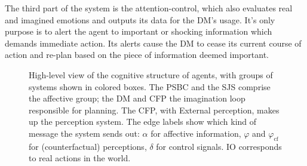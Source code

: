 The third part of the system is the attention-control, which also evaluates real and imagined emotions and outputs its data for the DM's usage. It's only purpose is to alert the agent to important or shocking information which demands immediate action. Its alerts cause the DM to cease its current course of action and re-plan based on the piece of information deemed important.

\begin{figure}
	\centering
	
	\caption{High-level view of the cognitive structure of agents, with groups of systems shown in colored boxes. The PSBC and the SJS comprise the affective group; the DM and CFP the imagination loop responsible for planning. The CFP, with External perception, makes up the perception system. The edge labels show which kind of message the system sends out: $\alpha$ for affective information, $\varphi$ and $\varphi_{\mathrm{cf}}$ for (counterfactual) perceptions, $\delta$ for control signals. IO corresponds to real actions in the world.}
	\label{fig:cognitive_system}
\end{figure}
